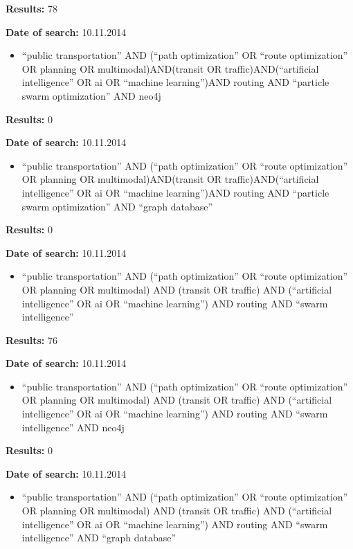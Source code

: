 \par \textbf{Results:} 78
\par \textbf{Date of search:} 10.11.2014
\begin{itemize}
	\item ``public transportation'' AND (``path optimization'' OR ``route optimization'' OR planning OR multimodal)AND(transit OR traffic)AND(``artificial intelligence'' OR ai OR ``machine learning'')AND routing AND ``particle swarm optimization'' AND neo4j
\end{itemize}
\par \textbf{Results:} 0
\par \textbf{Date of search:} 10.11.2014
\begin{itemize}
	\item ``public transportation'' AND (``path optimization'' OR ``route optimization'' OR planning OR multimodal)AND(transit OR traffic)AND(``artificial intelligence'' OR ai OR ``machine learning'')AND routing AND ``particle swarm optimization'' AND ``graph database''
\end{itemize}
\par \textbf{Results:} 0
\par \textbf{Date of search:} 10.11.2014
\begin{itemize}
	\item ``public transportation'' AND (``path optimization'' OR ``route optimization'' OR planning OR multimodal)  AND (transit OR traffic) AND (``artificial intelligence'' OR ai OR ``machine learning'') AND routing AND ``swarm intelligence''
\end{itemize}
\par \textbf{Results:} 76
\par \textbf{Date of search:} 10.11.2014
\begin{itemize}
	\item ``public transportation'' AND (``path optimization'' OR ``route optimization'' OR planning OR multimodal)  AND (transit OR traffic) AND (``artificial intelligence'' OR ai OR ``machine learning'') AND routing AND ``swarm intelligence'' AND neo4j
\end{itemize}
\par \textbf{Results:} 0
\par \textbf{Date of search:} 10.11.2014
\begin{itemize}
	\item ``public transportation'' AND (``path optimization'' OR ``route optimization'' OR planning OR multimodal)  AND (transit OR traffic) AND (``artificial intelligence'' OR ai OR ``machine learning'') AND routing AND ``swarm intelligence'' AND ``graph database''
\end{itemize}
